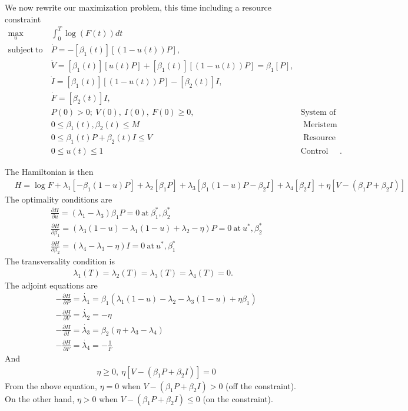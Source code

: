 \documentclass[12pt, oneside]{article}   	%
\begin{document}
We now rewrite our maximization problem, this time including a resource constraint
%
\begin{align}
\max_{u} &  \int_0^T  \log( F(t) ) dt  \nonumber \\
\mathrm{subject\ to\ } 
& \dot{P} = - [\beta_1(t)] [(1 - u(t)) P ] , \nonumber \\
& \dot{V} = [\beta_1(t)] [ u(t) P]  + [\beta_1(t)] [(1 - u(t)) P] = \beta_1 [P] , \nonumber \\ 
& \dot{I} = [\beta_1(t)] [( 1-u(t) ) P] - [\beta_2(t)] I, \nonumber \\ 
& \dot{F} = [\beta_2(t)] I , \nonumber \\ 
& P(0) > 0;\ V(0),\ I(0),\ F(0) \geq 0, & \mbox{System of ODEs, initial conditions}  \nonumber \\
& 0 \le \beta_1(t), \beta_2(t) \le M & \mbox{ Meristem constraint}  \nonumber \\
& 0 \le \beta_1(t) P + \beta_2(t) I \le V & \mbox{ Resource constraint} \nonumber \\
& 0 \leq u(t) \leq 1 & \mbox{Control constraint} \nonumber.  
\end{align}

The Hamiltonian is then 
%
\begin{align}
& H = \log F + \lambda_1 [ - \beta_1 (1-u) P ] + \lambda_2 [ \beta_1 P ]  + \lambda_3 [ \beta_1 (1-u) P - \beta_2 I ] + \lambda_4 [ \beta_2 I ] + \eta [V - (\beta_1 P + \beta_2 I) ]
\end{align}
%
The optimality conditions are
%
\begin{align}
& \frac{\partial H}{\partial u} = (\lambda_1 - \lambda_3) \beta_1 P = 0\ \mathrm{at}\ \beta_1^*, \beta_2^* \\
&\frac{\partial H}{\partial \beta_1} =  (\lambda_3(1-u) - \lambda_1 (1-u) + \lambda_2 - \eta) P = 0\ \mathrm{at}\ u^*, \beta_2^* \\
&\frac{\partial H}{\partial \beta_2} =  (\lambda_4 - \lambda_3 - \eta) I = 0\ \mathrm{at}\ u^*, \beta_1^*
\end{align}
%
The transversality condition is
%
\begin{align}
\lambda_1(T) = \lambda_2(T) = \lambda_3(T) = \lambda_4(T) = 0.
\end{align}
%
The adjoint equations are
%
\begin{align}
&-\frac{\partial H}{\partial P} = \dot{\lambda_1}  = \beta_1 ( \lambda_1 (1-u) - \lambda_2 - \lambda_3 (1-u) + \eta \beta_1 ) \nonumber \\
&-\frac{\partial H}{\partial V} = \dot{\lambda_2}  = - \eta  \nonumber\\
&-\frac{\partial H}{\partial I} = \dot{\lambda_3}  = \beta_2(\eta + \lambda_3-\lambda_4) \nonumber \\
&-\frac{\partial H}{\partial F} = \dot{\lambda_4}  = -\frac{1}{F}  
\end{align}
%
And 
\begin{align}
& \eta \geq 0,\ \eta [V-(\beta_1 P + \beta_2 I) ] = 0  
\end{align}
% 
From the above equation,  $\eta = 0$ when $V - (\beta_1 P + \beta_2 I) > 0 $ (off the constraint). On the other hand, $\eta > 0$ when $V - (\beta_1 P + \beta_2 I) \leq 0$ (on the constraint).
\end{document}
